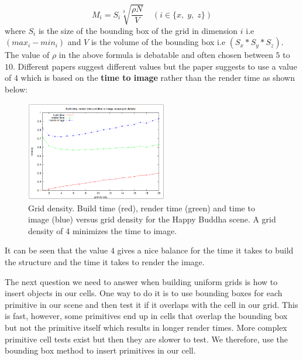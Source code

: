 \documentclass[11pt,a4paper]{article}
\begin{document}
\begin{equation}
M_{i} = S_{i} \sqrt[3]{\frac{\rho N}{V}}\;\;\;\; (i \in \{x,\;y,\;z\})
\end{equation}
where $S_{i}$ is the size of the bounding box of the grid in dimension $i$ i.e $(max_{i} - min_{i})$ and $V$ is the volume of the bounding box i.e $(S_{x} * S_{y} * S_{z})$.  The value of $\rho$ in the above formula is debatable and often chosen between $5$ to $10$. Different papers suggest different values but the paper \cite{lagae2008compact} suggests to use a value of $4$ which is based on the \textbf{time to image} rather than the render time as shown below:
\begin{figure}[H]
	\centering
	\captionsetup{justification=centering,margin=2cm}
	\includegraphics[width=0.55\textwidth]{grid_density_graph}
	\caption{Grid density. Build time (red), render time (green) and
time to image (blue) versus grid density for the Happy Buddha
scene. A grid density of 4 minimizes the time to image. \protect\cite{lagae2008compact}}
\end{figure}
It can be seen that the value $4$ gives a nice balance for the time it takes to build the structure and the time it takes to render the image.
\\
\noindent

The next question we need to answer when building uniform grids is how to insert objects in our cells. One way to do it is to use bounding boxes for each primitive in our scene and then test it if it overlaps with the cell in our grid. This is fast, however, some primitives end up in cells that overlap the bounding box but not the primitive itself which results in longer render times. More complex primitive cell tests exist but then they are slower to test. We therefore, use the bounding box method to insert primitives in our cell.
\\
\noindent
\end{document}
